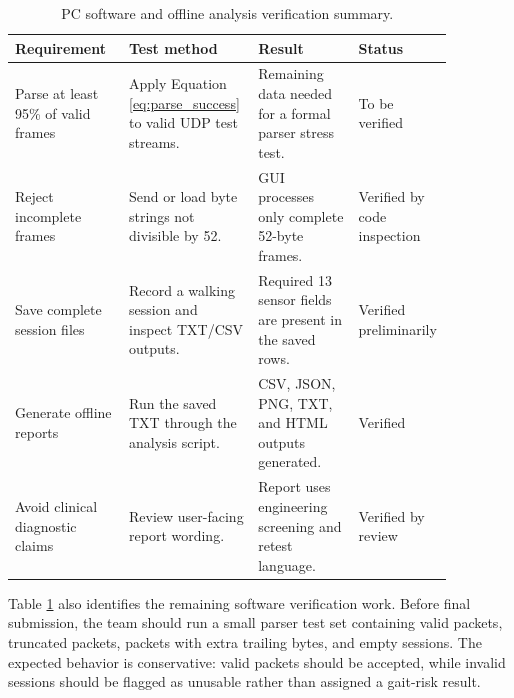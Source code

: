 \begin{table}[t]
\centering
\caption{PC software and offline analysis verification summary.}
\label{tab:pc_verification}
\begin{tabular}{|p{0.25\linewidth}|p{0.25\linewidth}|p{0.22\linewidth}|p{0.15\linewidth}|}
\hline
Requirement & Test method & Result & Status \\
\hline
Parse at least 95\% of valid frames & Apply Equation \eqref{eq:parse_success} to valid UDP test streams. & Remaining data needed for a formal parser stress test. & To be verified \\
\hline
Reject incomplete frames & Send or load byte strings not divisible by 52. & GUI processes only complete 52-byte frames. & Verified by code inspection \\
\hline
Save complete session files & Record a walking session and inspect TXT/CSV outputs. & Required 13 sensor fields are present in the saved rows. & Verified preliminarily \\
\hline
Generate offline reports & Run the saved TXT through the analysis script. & CSV, JSON, PNG, TXT, and HTML outputs generated. & Verified \\
\hline
Avoid clinical diagnostic claims & Review user-facing report wording. & Report uses engineering screening and retest language. & Verified by review \\
\hline
\end{tabular}
\end{table}

Table \ref{tab:pc_verification} also identifies the remaining software verification work. Before final submission, the team should run a small parser test set containing valid packets, truncated packets, packets with extra trailing bytes, and empty sessions. The expected behavior is conservative: valid packets should be accepted, while invalid sessions should be flagged as unusable rather than assigned a gait-risk result.
